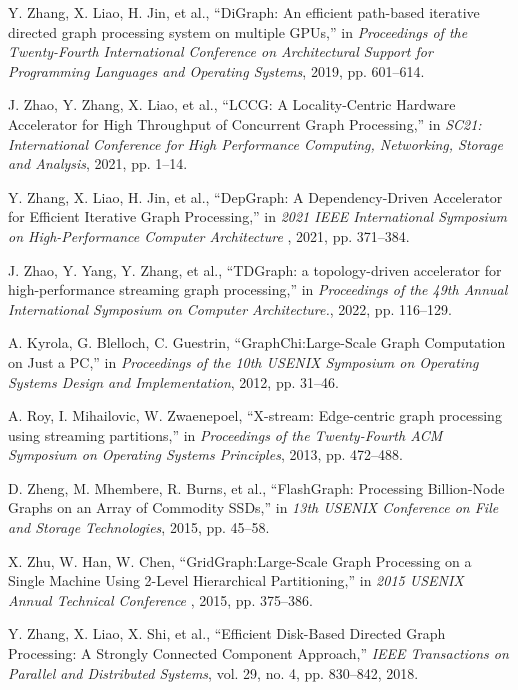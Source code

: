 \documentclass[lettersize,journal]{IEEEtran} %
\begin{document}
\begin{thebibliography}{100}
  Y. Zhang, X. Liao, H. Jin, et al., ``DiGraph: An efficient path-based iterative directed graph processing system on multiple GPUs,'' in \textit{Proceedings of the Twenty-Fourth International Conference on Architectural Support for Programming Languages and Operating Systems}, 2019, pp. 601--614.
  
  J. Zhao, Y. Zhang, X. Liao, et al., ``LCCG: A Locality-Centric Hardware Accelerator for High Throughput of Concurrent Graph Processing,'' in \textit{SC21: International Conference for High Performance Computing, Networking, Storage and Analysis}, 2021, pp. 1--14.
  
  Y. Zhang, X. Liao, H. Jin, et al., ``DepGraph: A Dependency-Driven Accelerator for Efficient Iterative Graph Processing,'' in \textit{2021 IEEE International Symposium on High-Performance Computer Architecture }, 2021, pp. 371--384.
  
  J. Zhao, Y. Yang, Y. Zhang, et al., ``TDGraph: a topology-driven accelerator for high-performance streaming graph processing,'' in \textit{Proceedings of the 49th Annual International Symposium on Computer Architecture.}, 2022, pp. 116--129.
  
  A. Kyrola, G. Blelloch, C. Guestrin, ``{GraphChi}:{Large-Scale} Graph Computation on Just a {PC},'' in \textit{Proceedings of the 10th USENIX Symposium on Operating Systems Design and Implementation}, 2012, pp. 31--46.
  
  A. Roy, I. Mihailovic, W. Zwaenepoel,  ``X-stream: Edge-centric graph processing using streaming partitions,'' in \textit{Proceedings of the Twenty-Fourth ACM Symposium on Operating Systems Principles}, 2013, pp. 472--488.
  
  D. Zheng, M. Mhembere, R. Burns, et al., ``{FlashGraph}: Processing {Billion-Node} Graphs on an Array of Commodity {SSDs},'' in \textit{13th USENIX Conference on File and Storage Technologies}, 2015, pp. 45--58.
  
  X. Zhu, W. Han, W. Chen, ``{GridGraph}:{Large-Scale} Graph Processing on a Single Machine Using 2-Level Hierarchical Partitioning,'' in \textit{2015 USENIX Annual Technical Conference }, 2015, pp. 375--386.
  
  Y. Zhang, X. Liao, X. Shi, et al., ``Efficient Disk-Based Directed Graph Processing: A Strongly Connected Component Approach,'' \textit{IEEE Transactions on Parallel and Distributed Systems}, vol. 29, no. 4, pp. 830--842, 2018.
  

\end{thebibliography}
\end{document}
